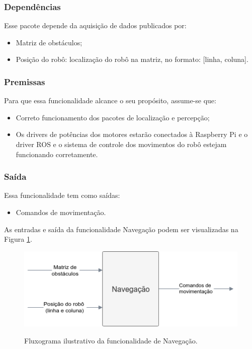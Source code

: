 \subsubsection{Dependências}
Esse pacote depende da aquisição de dados publicados por:
\begin{itemize}
	\item Matriz de obstáculos;
	\item Posição do robô: localização do robô na matriz, no formato: [linha, coluna].
\end{itemize}

\subsubsection{Premissas}
Para que essa funcionalidade alcance o seu propósito, assume-se que:
\begin{itemize}
	\item Correto funcionamento dos pacotes de localização e percepção;
	\item Os drivers de potências dos motores estarão conectados à Raspberry Pi e o driver ROS e o sistema de controle dos movimentos do robô estejam funcionando corretamente.
\end{itemize}

\subsubsection{Saída}
Essa funcionalidade tem como saídas:
\begin{itemize}
	\item Comandos de movimentação.
\end{itemize}

As entradas e saída da funcionalidade Navegação podem ser visualizadas na Figura \ref{fig:especificacao_funcional_navegacao}.

\begin{figure}[H]
	\centering
	\caption{Fluxograma ilustrativo da funcionalidade de Navegação.}
	\includegraphics[width=1\textwidth]
	{Figures/especificacao_funcional_navegacao}
	\label{fig:especificacao_funcional_navegacao}
\end{figure}

